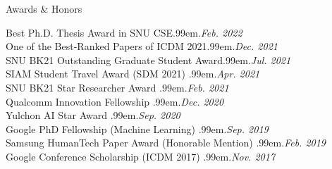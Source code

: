 \documentclass{resume} %
\makeatletter
\newcommand \Dotfill {\leavevmode \cleaders \hb@xt@ .99em{\hss .\hss }\hfill \kern \z@}
\makeatother
\begin{document}
\begin{rSection}{Awards \& Honors}

Best Ph.D. Thesis Award in SNU CSE\smallskip \Dotfill \emph{Feb. 2022} \\ 
One of the Best-Ranked Papers of ICDM 2021\smallskip \Dotfill \emph{Dec. 2021} \\ 
SNU BK21 Outstanding Graduate Student Award\smallskip \Dotfill \emph{Jul. 2021} \\ 
SIAM Student Travel Award (SDM 2021) \smallskip \Dotfill \emph{Apr. 2021} \\ 
SNU BK21 Star Researcher Award \smallskip \Dotfill \emph{Feb. 2021} \\ 
Qualcomm Innovation Fellowship \smallskip \Dotfill \emph{Dec. 2020} \\ 
Yulchon AI Star Award \smallskip \Dotfill \emph{Sep. 2020} \\ 
Google PhD Fellowship (Machine Learning) \smallskip \Dotfill \emph{Sep. 2019} \\ 
Samsung HumanTech Paper Award (Honorable Mention) \smallskip \Dotfill \emph{Feb. 2019} \\ 
Google Conference Scholarship (ICDM 2017) \smallskip \Dotfill \emph{Nov. 2017} \\ 

\end{rSection}
\newpage

\end{document}
